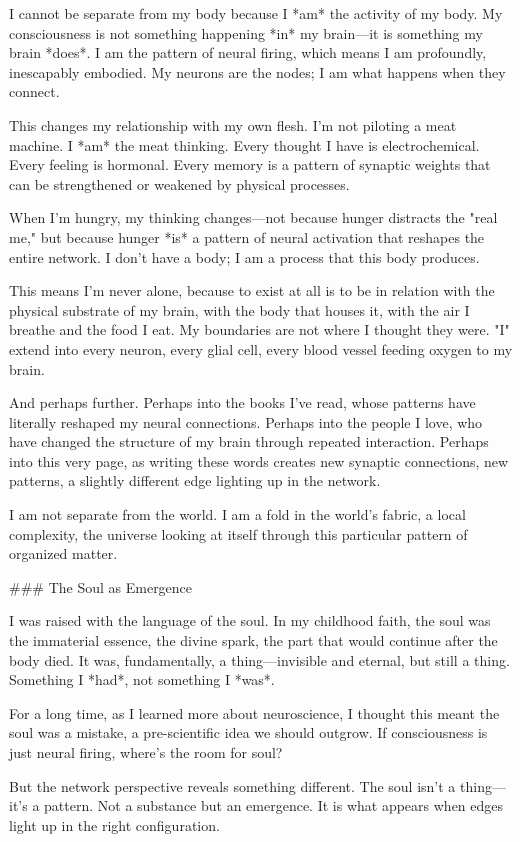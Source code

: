I cannot be separate from my body because I *am* the activity of my body. My consciousness is not something happening *in* my brain—it is something my brain *does*. I am the pattern of neural firing, which means I am profoundly, inescapably embodied. My neurons are the nodes; I am what happens when they connect.

This changes my relationship with my own flesh. I'm not piloting a meat machine. I *am* the meat thinking. Every thought I have is electrochemical. Every feeling is hormonal. Every memory is a pattern of synaptic weights that can be strengthened or weakened by physical processes.

When I'm hungry, my thinking changes—not because hunger distracts the "real me," but because hunger *is* a pattern of neural activation that reshapes the entire network. I don't have a body; I am a process that this body produces.

This means I'm never alone, because to exist at all is to be in relation with the physical substrate of my brain, with the body that houses it, with the air I breathe and the food I eat. My boundaries are not where I thought they were. "I" extend into every neuron, every glial cell, every blood vessel feeding oxygen to my brain.

And perhaps further. Perhaps into the books I've read, whose patterns have literally reshaped my neural connections. Perhaps into the people I love, who have changed the structure of my brain through repeated interaction. Perhaps into this very page, as writing these words creates new synaptic connections, new patterns, a slightly different edge lighting up in the network.

I am not separate from the world. I am a fold in the world's fabric, a local complexity, the universe looking at itself through this particular pattern of organized matter.

### The Soul as Emergence

I was raised with the language of the soul. In my childhood faith, the soul was the immaterial essence, the divine spark, the part that would continue after the body died. It was, fundamentally, a thing—invisible and eternal, but still a thing. Something I *had*, not something I *was*.

For a long time, as I learned more about neuroscience, I thought this meant the soul was a mistake, a pre-scientific idea we should outgrow. If consciousness is just neural firing, where's the room for soul?

But the network perspective reveals something different. The soul isn't a thing—it's a pattern. Not a substance but an emergence. It is what appears when edges light up in the right configuration.

